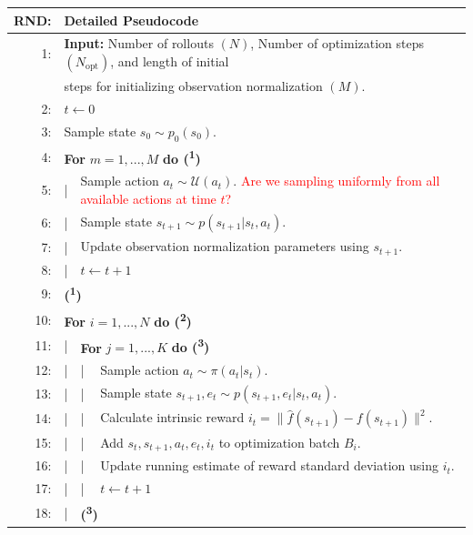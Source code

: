 \begin{table}[h!]
  \centering
  \begin{tabular}{rlll}
    \hline\hline
    \textbf{RND:} & \multicolumn{3}{l}{Detailed Pseudocode}\\
    \hline
    1: & \multicolumn{3}{l}{\textbf{Input:} Number of rollouts $(N)$, Number of optimization steps $(N_{\text{opt}})$, and length of initial}\\
    & \multicolumn{3}{l}{steps for initializing observation normalization $(M)$.}\\
    2: & \multicolumn{3}{l}{$t \leftarrow 0$}\\
    3: & \multicolumn{3}{l}{Sample state $s_{0} \sim p_{0}(s_{0})$.}\\
    4: & \multicolumn{3}{l}{\textbf{For} $m = 1, ..., M$ \textbf{do (\textsuperscript{1})}}\\
    5: & | & \multicolumn{2}{l}{Sample action $a_{t} \sim \mathcal{U}(a_{t})$. \textcolor{red}{Are we sampling uniformly from all available actions at time $t$?}}\\
    6: & | & \multicolumn{2}{l}{Sample state $s_{t+1} \sim p(s_{t+1}|s_{t}, a_{t})$.}\\
    7: & | & \multicolumn{2}{l}{Update observation normalization parameters using $s_{t+1}$.}\\
    8: & | & \multicolumn{2}{l}{$t \leftarrow t + 1$}\\
    9: & \multicolumn{3}{l}{\textbf{(\textsuperscript{1})}}\\
    10: & \multicolumn{3}{l}{\textbf{For} $i = 1, ..., N$ \textbf{do (\textsuperscript{2})}}\\
    11: & | & \multicolumn{2}{l}{\textbf{For} $j = 1, ..., K$ \textbf{do (\textsuperscript{3})}}\\
    12: & | & | & Sample action $a_{t} \sim \pi(a_{t}|s_{t})$.\\
    13: & | & | & Sample state $s_{t+1}, e_{t} \sim p(s_{t+1}, e_{t}|s_{t}, a_{t})$.\\
    14: & | & | & Calculate intrinsic reward $i_{t} = \|\hat{f}(s_{t+1}) - f(s_{t+1})\|^{2}$.\\
    15: & | & | & Add $s_{t}, s_{t+1}, a_{t}, e_{t}, i_{t}$ to optimization batch $B_{i}$.\\
    16: & | & | & Update running estimate of reward standard deviation using $i_{t}$.\\
    17: & | & | & $t \leftarrow t + 1$\\
    18: & | & \multicolumn{2}{l}{\textbf{(\textsuperscript{3})}}\\

\end{tabular}
\end{table}

